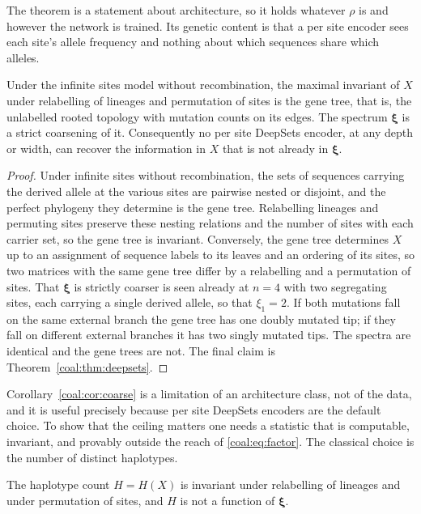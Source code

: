 The theorem is a statement about architecture, so it holds whatever $\rho$ is and however the network is trained. Its genetic content is that a per site encoder sees each site's allele frequency and nothing about which sequences share which alleles.

\begin{corollary}\label{coal:cor:coarse}
Under the infinite sites model without recombination, the maximal invariant of $X$ under relabelling of lineages and permutation of sites is the gene tree, that is, the unlabelled rooted topology with mutation counts on its edges. The spectrum $\bm{\xi}$ is a strict coarsening of it. Consequently no per site DeepSets encoder, at any depth or width, can recover the information in $X$ that is not already in $\bm{\xi}$.
\end{corollary}

\begin{proof}
Under infinite sites without recombination, the sets of sequences carrying the derived allele at the various sites are pairwise nested or disjoint, and the perfect phylogeny they determine is the gene tree. Relabelling lineages and permuting sites preserve these nesting relations and the number of sites with each carrier set, so the gene tree is invariant. Conversely, the gene tree determines $X$ up to an assignment of sequence labels to its leaves and an ordering of its sites, so two matrices with the same gene tree differ by a relabelling and a permutation of sites. That $\bm{\xi}$ is strictly coarser is seen already at $n=4$ with two segregating sites, each carrying a single derived allele, so that $\xi_1=2$. If both mutations fall on the same external branch the gene tree has one doubly mutated tip; if they fall on different external branches it has two singly mutated tips. The spectra are identical and the gene trees are not. The final claim is Theorem~\ref{coal:thm:deepsets}.
\end{proof}

Corollary~\ref{coal:cor:coarse} is a limitation of an architecture class, not of the data, and it is useful precisely because per site DeepSets encoders are the default choice. To show that the ceiling matters one needs a statistic that is computable, invariant, and provably outside the reach of \eqref{coal:eq:factor}. The classical choice is the number of distinct haplotypes.

\begin{proposition}\label{coal:prop:hap}
The haplotype count $H=H(X)$ is invariant under relabelling of lineages and under permutation of sites, and $H$ is not a function of $\bm{\xi}$.
\end{proposition}

